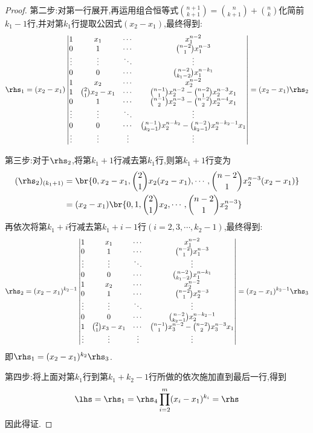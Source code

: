 \documentclass{article}
\theoremstyle{definition}
\begin{document}
\begin{proof}
    第二步:对第一行展开,再运用组合恒等式$ \binom{n+1}{k+1}=\binom{n}{k+1}+\binom{n}{k}$化简前$k_1-1$行,并对第$k_1$行提取公因式$(x_2-x_1)$,最终得到:
    $$\rhs_1=(x_2-x_1)\begin{vmatrix}
        1&x_1&\cdots&x^{n-2}_1\\
        0&1&\cdots&\binom{n-2}{1}x^{n-3}_1\\
        \vdots&\vdots&\ddots&\vdots\\
        0&0&\cdots&\binom{n-2}{k_1-2}x^{n-k_1}_1\\
        1&x_2&\cdots&x^{n-2}_2\\
        1&\binom{2}{1}x_2-x_1&\cdots&\binom{n-1}{1}x^{n-2}_2-\binom{n-2}{1}x^{n-3}_2x_1\\
        0&1&\cdots&\binom{n-1}{2}x^{n-3}_2-\binom{n-2}{2}x^{n-4}_2x_1\\
        \vdots&\vdots&\ddots&\vdots\\
        0&0&\cdots&\binom{n-1}{k_2-1}x^{n-k_2}_2-\binom{n-2}{k_2-1}x^{n-k_2-1}_2x_1\\
        \vdots&\vdots&\vdots&\vdots\\
    \end{vmatrix}=(x_2-x_1)\rhs_2$$

    第三步:对于$\rhs_2$,将第$k_1+1$行减去第$k_1$行,则第$k_1+1$行变为
    $$\begin{aligned}
        (\rhs_2)_{(k_1+1)}&=\br{0,x_2-x_1,\binom{2}{1}x_2(x_2-x_1),\cdots,\binom{n-2}{1}x^{n-3}_2(x_2-x_1)}\\
        &=(x_2-x_1)\br{0,1,\binom{2}{1}x_2,\cdots,\binom{n-2}{1}x_2^{n-3}}
    \end{aligned}$$
    再依次将第$k_1+i$行减去第$k_1+i-1$行$(i=2,3,\cdots,k_2-1)$,最终得到:
    $$\rhs_2=(x_2-x_1)^{k_2-1}\begin{vmatrix}
        1&x_1&\cdots&x^{n-2}_1\\
        0&1&\cdots&\binom{n-2}{1}x^{n-3}_1\\
        \vdots&\vdots&\ddots&\vdots\\
        0&0&\cdots&\binom{n-2}{k_1-2}x^{n-k_1}_1\\
        1&x_2&\cdots&x^{n-2}_2\\
        0&1&\cdots&\binom{n-2}{1}x^{n-3}_2\\
        \vdots&\vdots&\ddots&\vdots\\
        0&0&\cdots&\binom{n-2}{k_2-1}x^{n-k_2-1}_2\\
        1&\binom{2}{1}x_3-x_1&\cdots&\binom{n-1}{1}x_3^{n-2}-\binom{n-2}{2}x_3^{n-3}x_1\\
        \vdots&\vdots&\vdots&\vdots\\
    \end{vmatrix}=(x_2-x_1)^{k_2-1}\rhs_3$$
    即$\rhs_1=(x_2-x_1)^{k_2}\rhs_3$.

    第四步:将上面对第$k_1$行到第$k_1+k_2-1$行所做的依次施加直到最后一行,得到
    $$\lhs=\rhs_1=\rhs_4\prod_{i=2}^m(x_i-x_1)^{k_i}=\rhs$$
    因此得证.
\end{proof}
\end{document}
